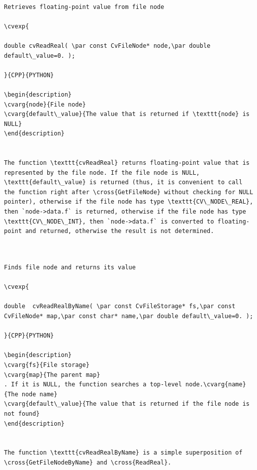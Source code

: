 \begin{verbatim}

Retrieves floating-point value from file node

\cvexp{

double cvReadReal( \par const CvFileNode* node,\par double default\_value=0. );

}{CPP}{PYTHON}

\begin{description}
\cvarg{node}{File node}
\cvarg{default\_value}{The value that is returned if \texttt{node} is NULL}
\end{description}


The function \texttt{cvReadReal} returns floating-point value that is represented by the file node. If the file node is NULL, \texttt{default\_value} is returned (thus, it is convenient to call the function right after \cross{GetFileNode} without checking for NULL pointer), otherwise if the file node has type \texttt{CV\_NODE\_REAL}, then `node->data.f` is returned, otherwise if the file node has type \texttt{CV\_NODE\_INT}, then `node->data.f` is converted to floating-point and returned, otherwise the result is not determined.


\end{verbatim}
\label{ReadRealByName}
\begin{verbatim}

Finds file node and returns its value

\cvexp{

double  cvReadRealByName( \par const CvFileStorage* fs,\par const CvFileNode* map,\par const char* name,\par double default\_value=0. );

}{CPP}{PYTHON}

\begin{description}
\cvarg{fs}{File storage}
\cvarg{map}{The parent map}
. If it is NULL, the function searches a top-level node.\cvarg{name}{The node name}
\cvarg{default\_value}{The value that is returned if the file node is not found}
\end{description}


The function \texttt{cvReadRealByName} is a simple superposition of \cross{GetFileNodeByName} and \cross{ReadReal}.


\end{verbatim}
